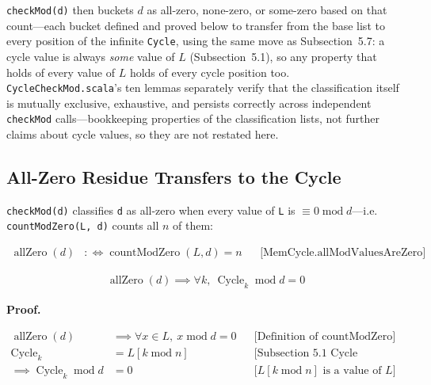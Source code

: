\texttt{checkMod(d)} then buckets $d$ as all-zero, none-zero, or some-zero
based on that count---each bucket defined and proved below to transfer from the
base list to every position of the infinite \texttt{Cycle}, using the same
move as Subsection~5.7: a cycle value is always \emph{some} value of $L$
(Subsection~5.1), so any property that holds of every value of $L$ holds of
every cycle position too. \texttt{CycleCheckMod.scala}'s ten lemmas separately
verify that the classification itself is mutually exclusive, exhaustive, and
persists correctly across independent \texttt{checkMod} calls---bookkeeping
properties of the classification lists, not further claims about cycle values,
so they are not restated here.

\subsection{All-Zero Residue Transfers to the Cycle}

\texttt{checkMod(d)} classifies \texttt{d} as all-zero when every value of
\texttt{L} is $\equiv 0\operatorname{mod}d$---i.e.
\texttt{countModZero(L, d)} counts all $n$ of them:

\begin{equation*}
\begin{aligned}
\operatorname{allZero}(d)
  &:\Leftrightarrow \operatorname{countModZero}(L,d)=n
  && \text{[MemCycle.allModValuesAreZero]}
\end{aligned}
\end{equation*}

\begin{equation*}
\begin{aligned}
\operatorname{allZero}(d)
  \implies \forall k,\ \operatorname{Cycle}_k\operatorname{mod}d=0
\end{aligned}
\end{equation*}

\noindent\textbf{Proof.}

\begin{equation*}
\begin{aligned}
\operatorname{allZero}(d)
  &\implies \forall x\in L,\ x\operatorname{mod}d=0
  && \text{[Definition of countModZero]} \\
\operatorname{Cycle}_k
  &=L[k\operatorname{mod}n]
  && \text{[Subsection 5.1 Cycle Element Access]} \\
\implies \operatorname{Cycle}_k\operatorname{mod}d
  &=0
  && \text{[$L[k\operatorname{mod}n]$ is a value of $L$]}
\end{aligned}
\end{equation*}

